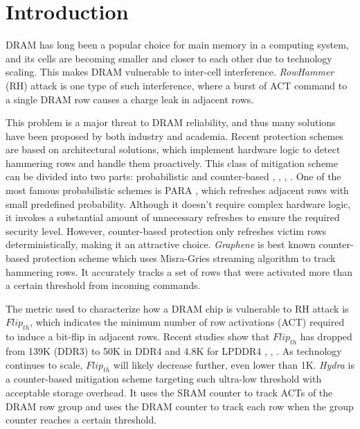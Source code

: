 \chapter{Introduction}

DRAM has long been a popular choice for main memory in a computing system, 
and its cells are becoming smaller and closer to each other due to technology scaling. 
This makes DRAM vulnerable to inter-cell interference. \textit{RowHammer} (RH) attack 
is one type of such interference, where a burst of ACT command to a single DRAM row causes
 a charge leak in adjacent rows. 

This problem is a major threat to DRAM reliability, and thus many solutions have been proposed 
by both industry and academia. Recent protection schemes are based on architectural solutions, 
which implement hardware logic to detect hammering rows and handle them proactively. 
This class of mitigation scheme can be divided into two parts: probabilistic \cite{FlippingBits} and 
counter-based \cite{Graphene}, \cite{Hydra}, \cite{TWICE}, \cite{CBT}. 
One of the most famous probabilistic schemes is PARA \cite{FlippingBits}, which refreshes adjacent rows 
with small predefined probability. Although it doesn't require complex hardware logic, 
it invokes a substantial amount of unnecessary refreshes to ensure the required security level. 
However, counter-based protection only refreshes victim rows deterministically, making it an 
attractive choice. \textit{Graphene} \cite{Graphene} is best known counter-based protection 
scheme which uses Misra-Gries streaming algorithm \cite{MISRA-GRIES} to track hammering rows. 
It accurately tracks a set of rows that were activated more than a certain threshold from incoming commands.

The metric used to characterize how a DRAM chip is vulnerable to RH attack is $Flip_{th}$, 
which indicates the minimum number of row activations (ACT) required to induce a bit-flip in adjacent rows. 
Recent studies show that $Flip_{th}$ has dropped from 139K (DDR3) to 50K in DDR4 and 4.8K for LPDDR4 
\cite{FlippingBits}, \cite{TRRespass}, \cite{Revisiting}. As technology continues to scale, 
$Flip_{th}$ will likely decrease further, even lower than 1K. \textit{Hydra} \cite{Hydra} is a 
counter-based mitigation scheme targeting such ultra-low threshold with acceptable storage overhead. 
It uses the SRAM counter to track ACTs of the DRAM row group and uses the DRAM counter to track 
each row when the group counter reaches a certain threshold. 

